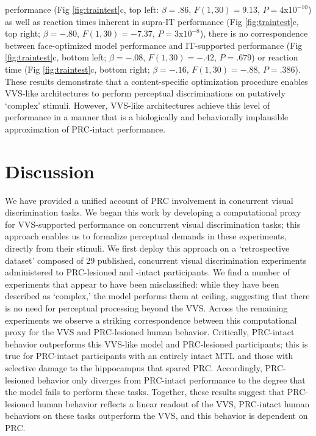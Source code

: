 \documentclass[11pt]{article}
\begin{document}
performance (Fig \ref{fig:traintest}c, top left: $\beta = .86$, $F(1,30) = 9.13$, $P = 4$x$10^{-10}$) as well as reaction times inherent in supra-IT performance (Fig \ref{fig:traintest}c, top right; $\beta = -.80$, $F(1,30) = -7.37$, $P = 3$x$10^{-8}$), there is no correspondence between face-optimized model performance and IT-supported performance (Fig \ref{fig:traintest}c, bottom left; $\beta = -.08$, $F(1, 30) = -.42$, $P = .679$) or reaction time (Fig \ref{fig:traintest}c, bottom right; $\beta = -.16$, $F(1, 30) = -.88$, $P = .386$). These results demonstrate that a content-specific optimization procedure enables VVS-like architectures to perform perceptual discriminations on putatively `complex' stimuli. However, VVS-like architectures achieve this level of performance in a manner that is a biologically and behaviorally implausible approximation of PRC-intact performance.

\section{Discussion}

We have provided a unified account of PRC involvement in concurrent visual discrimination tasks. We began this work by developing a computational proxy for VVS-supported performance on concurrent visual discrimination tasks; this approach enables us to formalize perceptual demands in these experiments, directly from their stimuli. We first deploy this approach on a `retrospective dataset' composed of 29 published, concurrent visual discrimination experiments administered to PRC-lesioned and -intact participants. We find a number of experiments that appear to have been misclassified: while they have been described as `complex,' the model performs them at ceiling, suggesting that there is no need for perceptual processing beyond the VVS. Across the remaining experiments we observe a striking correspondence between this computational proxy for the VVS and PRC-lesioned human behavior. Critically, PRC-intact behavior outperforms this VVS-like model and PRC-lesioned participants; this is true for PRC-intact participants with an entirely intact MTL and those with selective damage to the hippocampus that spared PRC. Accordingly, PRC-lesioned behavior only diverges from PRC-intact performance to the degree that the model fails to perform these tasks. Together, these results suggest that PRC-lesioned human behavior reflects a linear readout of the VVS, PRC-intact human behaviors on these tasks outperform the VVS, and this behavior is dependent on PRC.
\end{document}

